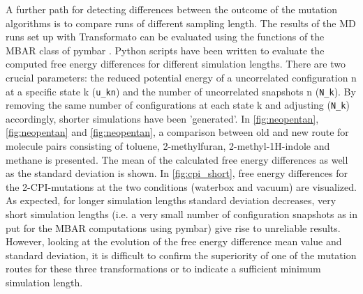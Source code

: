 A further path for detecting differences between the outcome of the mutation algorithms is to compare runs of different sampling length. 
The results of the MD runs set up with Transformato can be evaluated using the functions of the MBAR class of pymbar \cite{Shirts.2008}. Python scripts have been written to evaluate the computed free energy differences for different simulation lengths. There are two crucial parameters: the reduced potential energy of a uncorrelated configuration n at a specific state k (\texttt{u\_kn}) and the number of uncorrelated snapshots n (\texttt{N\_k}). By removing the same number of configurations at each state k and adjusting (\texttt{N\_k}) accordingly, shorter simulations have been 'generated'.
In \ref{fig:neopentan}, \ref{fig:neopentan} and \ref{fig:neopentan}, a comparison between old and new route for molecule pairs consisting of toluene, 2-methylfuran, 2-methyl-1H-indole and methane is presented. The mean of the calculated free energy differences as well as the standard deviation is shown. In \ref{fig:cpi_short}, free energy differences for the 2-CPI-mutations at the two conditions (waterbox and vacuum) are visualized. 
As expected, for longer simulation lengths standard deviation decreases, very short simulation lengths (i.e. a very small number of configuration snapshots as in put for the MBAR computations using pymbar) give rise to unreliable results. However, looking at the evolution of the free energy difference mean value and standard deviation, it is difficult to confirm the superiority of one of the mutation routes for these three transformations or to indicate a sufficient minimum simulation length.



